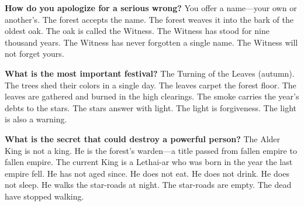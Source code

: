 \begin{almanac}
\textbf{How do you apologize for a serious wrong?} You offer a name---your own or another's. The forest accepts the name. The forest weaves it into the bark of the oldest oak. The oak is called the Witness. The Witness has stood for nine thousand years. The Witness has never forgotten a single name. The Witness will not forget yours.

\textbf{What is the most important festival?} The Turning of the Leaves (autumn). The trees shed their colors in a single day. The leaves carpet the forest floor. The leaves are gathered and burned in the high clearings. The smoke carries the year's debts to the stars. The stars answer with light. The light is forgiveness. The light is also a warning.

\textbf{What is the secret that could destroy a powerful person?} The Alder King is not a king. He is the forest's warden---a title passed from fallen empire to fallen empire. The current King is a Lethai-ar who was born in the year the last empire fell. He has not aged since. He does not eat. He does not drink. He does not sleep. He walks the star-roads at night. The star-roads are empty. The dead have stopped walking.
\end{almanac}

\newpage

\newpage